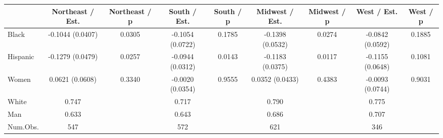 
\begin{tabular}[t]{lcccccccc}
\toprule
  & Northeast / Est. & Northeast / p & South / Est. & South / p & Midwest / Est. & Midwest / p & West / Est. & West / p\\
\midrule
Black & -0.1044 
(0.0407) & 0.0305 & -0.1054 
(0.0722) & 0.1785 & -0.1398 
(0.0532) & 0.0274 & -0.0842 
(0.0592) & 0.1885\\
Hispanic & -0.1279 
(0.0479) & 0.0257 & -0.0944 
(0.0312) & 0.0143 & -0.1183 
(0.0375) & 0.0117 & -0.1155 
(0.0648) & 0.1081\\
Women & 0.0621 
(0.0608) & 0.3340 & -0.0020 
(0.0354) & 0.9555 & 0.0352 
(0.0433) & 0.4383 & -0.0093 
(0.0744) & 0.9031\\
\midrule
White & 0.747 &  & 0.717 &  & 0.790 &  & 0.775 & \\
Man & 0.633 &  & 0.643 &  & 0.686 &  & 0.707 & \\
Num.Obs. & 547 &  & 572 &  & 621 &  & 346 & \\
\bottomrule
\end{tabular}

